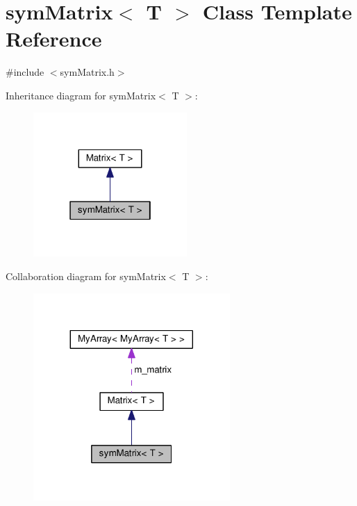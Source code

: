 \hypertarget{classsymMatrix}{}\section{sym\+Matrix$<$ T $>$ Class Template Reference}
\label{classsymMatrix}


{\ttfamily \#include $<$sym\+Matrix.\+h$>$}



Inheritance diagram for sym\+Matrix$<$ T $>$\+:\nopagebreak
\begin{figure}[H]
\begin{center}
\leavevmode
\includegraphics[width=166pt]{classsymMatrix__inherit__graph}
\end{center}
\end{figure}


Collaboration diagram for sym\+Matrix$<$ T $>$\+:\nopagebreak
\begin{figure}[H]
\begin{center}
\leavevmode
\includegraphics[width=212pt]{classsymMatrix__coll__graph}
\end{center}
\end{figure}
